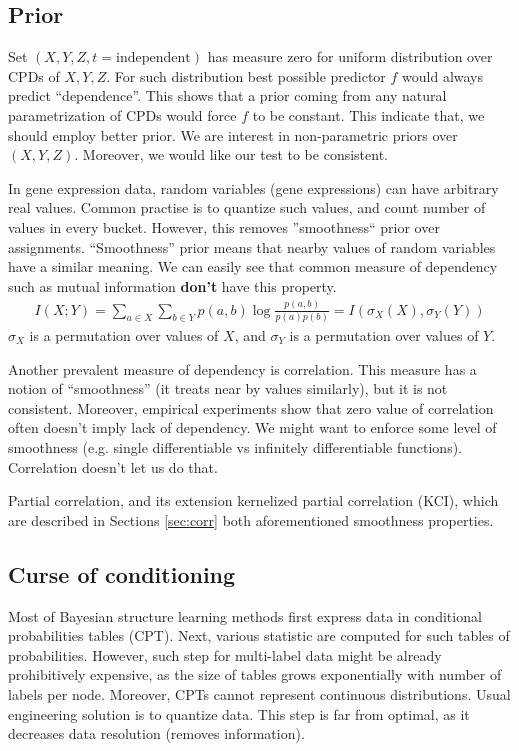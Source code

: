 \documentclass{article} %
\begin{document}
\subsection{Prior}\label{sec:prior}
Set $(X, Y, Z, t=\text{independent})$ has measure zero for uniform distribution over CPDs of $X, Y, Z$. For such distribution
best possible predictor $f$ would always predict ``dependence''. 
This shows that a prior coming from any natural parametrization
of CPDs would force $f$ to be constant. This indicate that, we should
employ better prior. We are interest in non-parametric priors over $(X, Y, Z)$.
Moreover, we would like our test to be consistent.


In gene expression data, random variables (gene expressions) can 
have arbitrary real values. Common practise is to quantize such values,
and count number of values in every bucket. However, this removes 
''smoothness`` prior over assignments. ``Smoothness'' prior means that
nearby values of random variables have a similar meaning. We can easily see
that common measure of dependency such as mutual information {\bf don't} have 
this property. 
\begin{align*}
  I(X;Y)=\sum_{a \in X}\sum_{b \in Y} p(a, b)\log{\frac{p(a, b)}{p(a)p(b)}}=I(\sigma_X(X), \sigma_Y(Y))
\end{align*}
$\sigma_X$ is a permutation over values of $X$, and $\sigma_Y$ is
a permutation over values of $Y$.


Another prevalent measure of dependency is correlation. This measure
has a notion of ``smoothness'' (it treats near by values similarly), but
it is not consistent. Moreover, empirical experiments show that zero value
of correlation often doesn't imply lack of dependency. We might want to 
enforce some level of smoothness (e.g. single differentiable vs infinitely 
differentiable functions). Correlation doesn't let us do that. 

Partial correlation, and its extension kernelized partial correlation (KCI), which are described 
in Sections \ref{sec:corr} both aforementioned smoothness properties.


\subsection{Curse of conditioning}\label{sec:curse}
Most of Bayesian structure learning methods first express data in conditional probabilities tables (CPT).
Next, various statistic are computed for such tables of probabilities. However, such step
for multi-label data might be already prohibitively expensive, as the size of tables grows
exponentially with number of labels per node. Moreover, CPTs cannot represent continuous
distributions. Usual engineering solution is to quantize data. This step is far from optimal,
as it decreases data resolution (removes information). 
\end{document}
